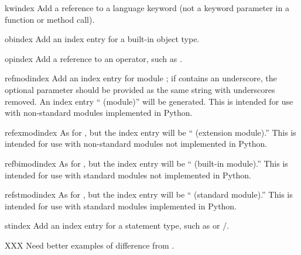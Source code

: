 \documentclass{howto}
\begin{document}
    \begin{macrodesc}{kwindex}{}
      Add a reference to a language keyword (not a keyword parameter
      in a function or method call).
    \end{macrodesc}

    \begin{macrodesc}{obindex}{}
      Add an index entry for a built-in object type.
    \end{macrodesc}

    \begin{macrodesc}{opindex}{}
      Add a reference to an operator, such as \samp{+}.
    \end{macrodesc}

    \begin{macrodesc}{refmodindex}{}
      Add an index entry for module ; if 
      contains an underscore, the optional parameter  should
      be provided as the same string with underscores removed.  An
      index entry `` (module)'' will be generated.  This
      is intended for use with non-standard modules implemented in
      Python.
    \end{macrodesc}

    \begin{macrodesc}{refexmodindex}{}
      As for , but the index entry will be
      `` (extension module).''  This is intended for use
      with non-standard modules not implemented in Python.
    \end{macrodesc}

    \begin{macrodesc}{refbimodindex}{}
      As for , but the index entry will be
      `` (built-in module).''  This is intended for use
      with standard modules not implemented in Python.
    \end{macrodesc}

    \begin{macrodesc}{refstmodindex}{}
      As for , but the index entry will be
      `` (standard module).''  This is intended for use
      with standard modules implemented in Python.
    \end{macrodesc}

    \begin{macrodesc}{stindex}{}
      Add an index entry for a statement type, such as 
      or /.

      XXX Need better examples of difference from .
    \end{macrodesc}
\end{document}

